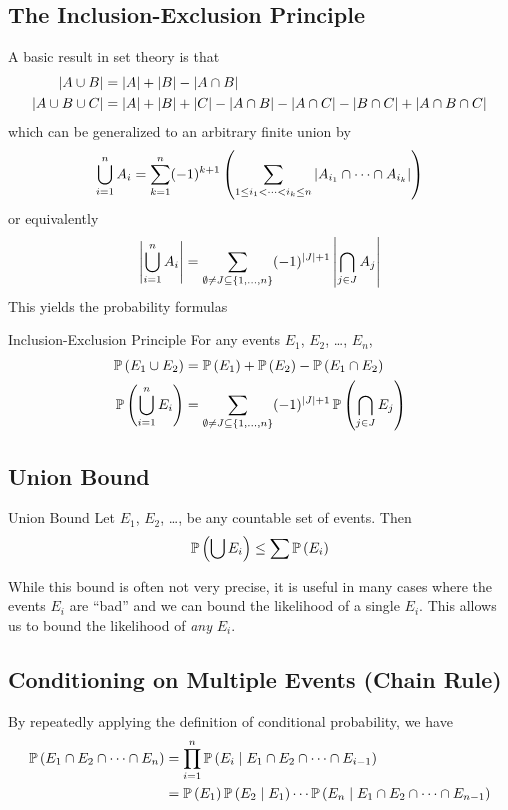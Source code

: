 \subsection{The Inclusion-Exclusion Principle}
A basic result in set theory is that
\begin{align*}
    \left\lvert A \cup B\right\rvert &= \left\lvert A\right\rvert + \left\lvert B\right\rvert - \left\lvert A \cap B\right\rvert\\
    \left\lvert A \cup B \cup C\right\rvert &= \left\lvert A\right\rvert + \left\lvert B\right\rvert + \left\lvert C\right\rvert - \left\lvert A \cap B\right\rvert - \left\lvert A \cap C\right\rvert - \left\lvert B \cap C\right\rvert + \left\lvert A \cap B \cap C\right\rvert
\end{align*}
which can be generalized to an arbitrary finite union by
\[\bigcup_{i=1}^n A_i = \sum_{k=1}^n (-1)^{k+1} \left(\sum_{1 \leq i_1 < \dots < i_k \leq n} \left\lvert A_{i_1} \cap \cdots \cap A_{i_k}\right\rvert \right)\]
or equivalently
\[\left\lvert\bigcup_{i=1}^n A_i\right\rvert = \sum_{\emptyset \neq J \subseteq \left\lbrace1,\dots,n\right\rbrace}
(-1)^{\left\lvert J\right\rvert+1} \left\lvert\bigcap_{j\in J} A_j\right\rvert\]
This yields the probability formulas
\begin{theorem}{Inclusion-Exclusion Principle}{}
    For any events $E_1$, $E_2$, \dots, $E_n$,
\begin{align*}
    \operatorname{\mathbb{P}}\left(E_1 \cup E_2\right) &= \operatorname{\mathbb{P}}\left(E_1\right) + \operatorname{\mathbb{P}}\left(E_2\right) - \operatorname{\mathbb{P}}\left(E_1 \cap E_2\right)\\
    \operatorname{\mathbb{P}}\left(\bigcup_{i=1}^n E_i\right) &= \sum_{\emptyset \neq J \subseteq \left\lbrace1,\dots,n\right\rbrace}
(-1)^{\left\lvert J\right\rvert+1} \operatorname{\mathbb{P}}\left(\bigcap_{j\in J} E_j\right)
\end{align*}
\end{theorem}

\subsection{Union Bound}
\begin{theorem}{Union Bound}{}
    Let $E_1$, $E_2$, \dots, be any countable set of events. Then
\[\operatorname{\mathbb{P}}\left(\bigcup E_i\right) \leq \sum\operatorname{\mathbb{P}}\left(E_i\right)\]
\end{theorem}
While this bound is often not very precise, it is useful in many cases where the
events $E_i$ are ``bad'' and we can bound the likelihood of a single $E_i$. This
allows us to bound the likelihood of \emph{any} $E_i$. 

\subsection{Conditioning on Multiple Events (Chain Rule)}
By repeatedly applying the definition of conditional probability, we have
\begin{align*}\operatorname{\mathbb{P}}\left(E_1 \cap E_2 \cap \dots \cap E_n\right)
    &= \prod_{i=1}^n \operatorname{\mathbb{P}}\left(E_i \mid E_1 \cap E_2 \cap \dots \cap E_{i-1}\right)\\
    &= \operatorname{\mathbb{P}}\left(E_1\right)\operatorname{\mathbb{P}}\left(E_2 \mid E_1\right)\cdots \operatorname{\mathbb{P}}\left(E_n \mid E_1 \cap E_2 \cap \dots \cap E_{n - 1}\right)\\
\end{align*}

